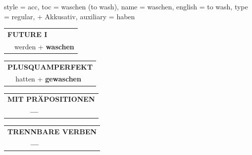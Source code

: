 \begin{verbentry}{
  style = {acc},
  toc = {waschen (to wash)},
  name = {waschen},
  english = {to wash},
  type = {regular, + Akkusativ},
  auxiliary = {haben}
}
\begin{tabular}{rl}
    \multicolumn{2}{l}{\textbf{FUTURE I} }\\
  &  werden + \textbf{waschen}\\
 
  \end{tabular}
\hfill
   \begin{tabular}{rl}
      \multicolumn{2}{l}{\textbf{PLUSQUAMPERFEKT}}\\
  &  hatten + \textbf{gewaschen}\\
  \end{tabular}
  
  
\vspace{10pt}

\begin{tabular}{lll}
\multicolumn{3}{l}{\textbf{MIT PRÄPOSITIONEN}}\\
& \textbf{---} & \\
\end{tabular}
\hfill
\begin{tabular}{lll}
\multicolumn{3}{l}{\textbf{TRENNBARE VERBEN}}\\
& \textbf{---} & \\
\end{tabular}
\vspace{-5pt}
\end{verbentry}


